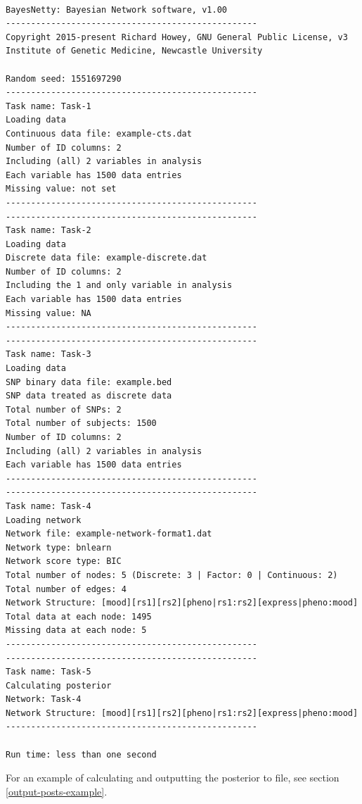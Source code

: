 \documentclass[a4paper,12pt]{article}
\begin{document}
\vspace{0.35cm} \begin{lstlisting}

BayesNetty: Bayesian Network software, v1.00
--------------------------------------------------
Copyright 2015-present Richard Howey, GNU General Public License, v3
Institute of Genetic Medicine, Newcastle University

Random seed: 1551697290
--------------------------------------------------
Task name: Task-1
Loading data
Continuous data file: example-cts.dat
Number of ID columns: 2
Including (all) 2 variables in analysis
Each variable has 1500 data entries
Missing value: not set
--------------------------------------------------
--------------------------------------------------
Task name: Task-2
Loading data
Discrete data file: example-discrete.dat
Number of ID columns: 2
Including the 1 and only variable in analysis
Each variable has 1500 data entries
Missing value: NA
--------------------------------------------------
--------------------------------------------------
Task name: Task-3
Loading data
SNP binary data file: example.bed
SNP data treated as discrete data
Total number of SNPs: 2
Total number of subjects: 1500
Number of ID columns: 2
Including (all) 2 variables in analysis
Each variable has 1500 data entries
--------------------------------------------------
--------------------------------------------------
Task name: Task-4
Loading network
Network file: example-network-format1.dat
Network type: bnlearn
Network score type: BIC
Total number of nodes: 5 (Discrete: 3 | Factor: 0 | Continuous: 2)
Total number of edges: 4
Network Structure: [mood][rs1][rs2][pheno|rs1:rs2][express|pheno:mood]
Total data at each node: 1495
Missing data at each node: 5
--------------------------------------------------
--------------------------------------------------
Task name: Task-5
Calculating posterior
Network: Task-4
Network Structure: [mood][rs1][rs2][pheno|rs1:rs2][express|pheno:mood]
--------------------------------------------------

Run time: less than one second

\end{lstlisting} \vspace{0.35cm}
For an example of calculating and outputting the posterior to file, see  section \ref{output-posts-example}. 



\end{document}
